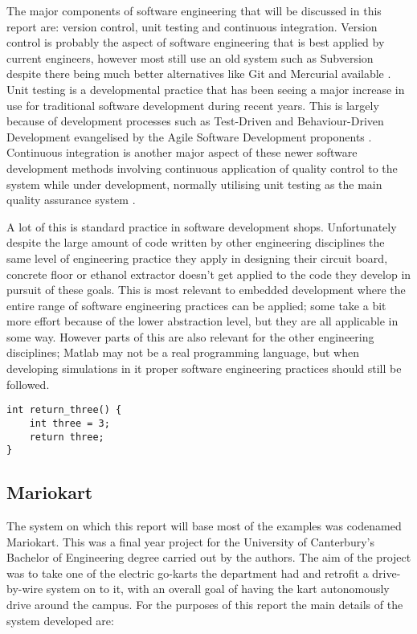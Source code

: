     The major components of software engineering that will be discussed in this
    report are: version control, unit testing and continuous integration.
    Version control is probably the aspect of software engineering that is best
    applied by current engineers, however most still use an old system such as
    Subversion despite there being much better alternatives like Git and
    Mercurial available
    \cite{Glassy:2006:UVC:1089182.1089195,Gurbani:2005:CSO:1083258.1083264}.
    Unit testing is a developmental practice that has been seeing a major
    increase in use for traditional software development during recent years.
    This is largely because of development processes such as Test-Driven and
    Behaviour-Driven Development evangelised by the Agile Software Development
    proponents \cite{Muller:2001:CSE:381473.381536}.  Continuous integration is
    another major aspect of these newer software development methods involving
    continuous application of quality control to the system while under
    development, normally utilising unit testing as the main quality assurance
    system \cite{Holck}.

    A lot of this is standard practice in software development shops.
    Unfortunately despite the large amount of code written by other engineering
    disciplines the same level of engineering practice they apply in designing
    their circuit board, concrete floor or ethanol extractor doesn't get applied
    to the code they develop in pursuit of these goals.  This is most relevant
    to embedded development where the entire range of software engineering
    practices can be applied; some take a bit more effort because of the lower
    abstraction level, but they are all applicable in some way.  However parts
    of this are also relevant for the other engineering disciplines; Matlab may
    not be a real programming language, but when developing simulations in it
    proper software engineering practices should still be followed.

\begin{lstlisting}[float,caption={Small function example.},label=function]
int return_three() {
    int three = 3;
    return three;
}
\end{lstlisting}

  \subsection{Mariokart}

    The system on which this report will base most of the examples was codenamed
    Mariokart.  This was a final year project for the University of Canterbury's
    Bachelor of Engineering degree carried out by the authors.  The aim of the
    project was to take one of the electric go-karts the department had and
    retrofit a drive-by-wire system on to it, with an overall goal of having the
    kart autonomously drive around the campus.  For the purposes of this report
    the main details of the system developed are:

